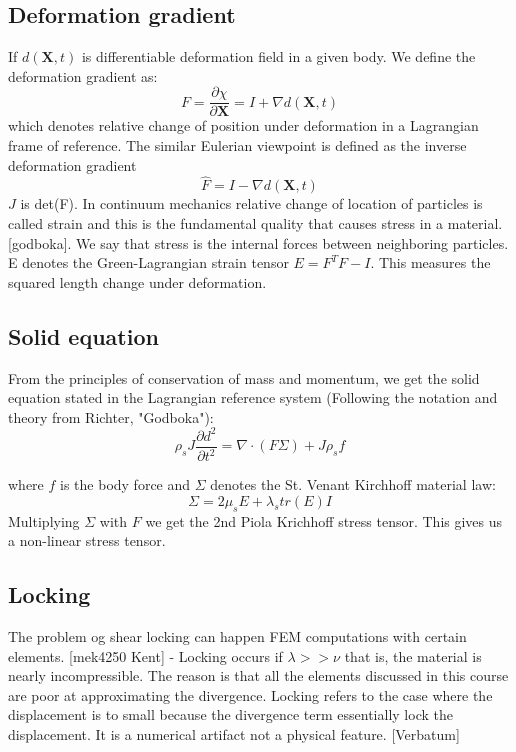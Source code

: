 \subsection*{Deformation gradient}

If $d(\textbf{X},t)$ is differentiable deformation field in a given body. We define the deformation gradient as:  
$$F = \frac{\partial \chi}{\partial \textbf{X}} = I + \nabla d(\textbf{X},t)$$ 
which denotes relative change of position under deformation in a Lagrangian frame of reference. The similar Eulerian viewpoint is defined as the inverse deformation gradient 
$$ \hat{F} = I - \nabla  d(\textbf{X},t)$$
$J$ is det(F).
In continuum mechanics relative change of location of particles is called strain and this is the fundamental quality that causes stress in a material. [godboka]. We say that stress is the internal forces between neighboring particles. E denotes the Green-Lagrangian strain tensor $ E = F^TF - I$. This measures the squared length change under deformation.

\subsection*{Solid equation}
From the principles of conservation of mass and momentum, we get the solid equation stated in the Lagrangian reference system (Following the notation and theory from Richter, "Godboka"):
\begin{equation}
\rho_s J \frac{\partial d^2}{\partial t^2} = \nabla \cdot ( F \Sigma ) + J\rho_s f 
\end{equation}

where $f$ is the body force and $\Sigma $ denotes the St. Venant Kirchhoff material law: 
$$ \Sigma = 2\mu_s E + \lambda_s tr(E) I $$ 
Multiplying $\Sigma $ with $F$ we get the 2nd Piola Krichhoff stress tensor. This gives us a non-linear stress tensor.

\subsection*{Locking}
The problem og shear locking can happen FEM computations with certain elements. 
[mek4250 Kent] - Locking occurs if  $ \lambda >> \nu $ that is, the material is nearly incompressible. The reason is that all the elements discussed in this course are poor at approximating the divergence. Locking refers to the case where the displacement is to small because the divergence term essentially lock the displacement. It is a numerical artifact not a physical feature. [Verbatum]






